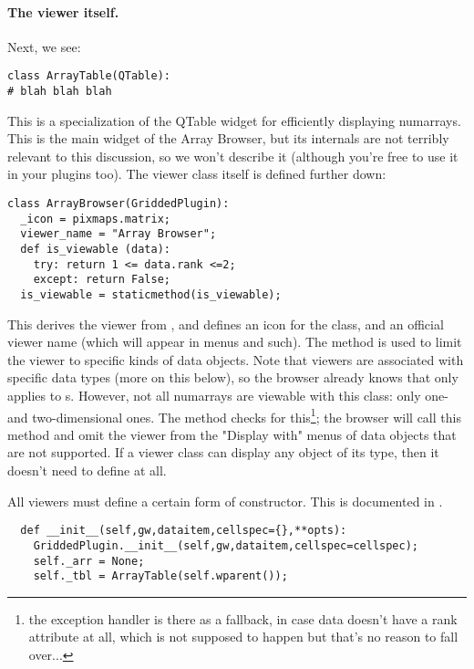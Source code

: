 \documentclass[12pt,twoside]{book}
\begin{document}
\paragraph{The viewer itself.} Next, we see:

\begin{verbatim}  
class ArrayTable(QTable):
# blah blah blah
\end{verbatim}

  This is a specialization of the QTable widget for efficiently displaying
  numarrays. This is the main widget of the Array Browser, but its internals are
  not terribly relevant to this discussion, so we won't describe it (although
  you're free to use it in your plugins too). The viewer class itself is defined
  further down:
  
\begin{verbatim}  
class ArrayBrowser(GriddedPlugin):
  _icon = pixmaps.matrix;
  viewer_name = "Array Browser";
  def is_viewable (data):
    try: return 1 <= data.rank <=2;
    except: return False;
  is_viewable = staticmethod(is_viewable);
\end{verbatim}

  This derives the viewer from , and defines an icon for the
  class, and an official viewer name (which will appear in menus and such).  The
   method is used to limit the viewer to specific kinds of
  data objects. Note that viewers are associated with specific data types (more
  on this below), so the browser already knows that  only
  applies to s. However, not all numarrays are viewable with this
  class: only one- and two-dimensional ones. The  method
  checks for this\footnote{the exception handler is there as a fallback, in case
  data doesn't have a rank attribute at all, which is not supposed to happen but
  that's no reason to fall over...}; the browser will call this method and omit
  the viewer from the "Display with" menus of data objects that are not
  supported. If a viewer class can display any object of its type, then it
  doesn't need to define  at all.
  
  All viewers must define a certain form of constructor. This is documented in
  .
  
\begin{verbatim}  
  def __init__(self,gw,dataitem,cellspec={},**opts):
    GriddedPlugin.__init__(self,gw,dataitem,cellspec=cellspec);
    self._arr = None;
    self._tbl = ArrayTable(self.wparent());
\end{verbatim}
\end{document}

